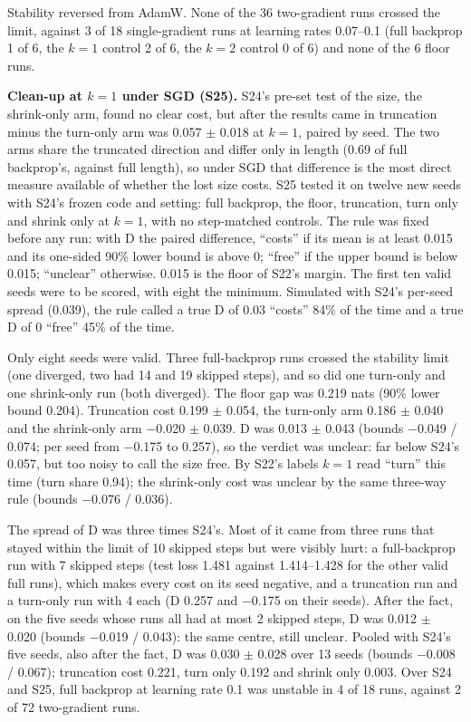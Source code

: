 \documentclass[10pt]{article}
\begin{document}
Stability reversed from AdamW. None of the 36 two-gradient runs crossed the limit, against 3 of 18 single-gradient runs at learning rates 0.07--0.1 (full backprop 1 of 6, the $k = 1$ control 2 of 6, the $k = 2$ control 0 of 6) and none of the 6 floor runs.

\textbf{Clean-up at $k = 1$ under SGD (S25).} S24's pre-set test of the size, the shrink-only arm, found no clear cost, but after the results came in truncation minus the turn-only arm was 0.057 $\pm$ 0.018 at $k = 1$, paired by seed. The two arms share the truncated direction and differ only in length (0.69 of full backprop's, against full length), so under SGD that difference is the most direct measure available of whether the lost size costs. S25 tested it on twelve new seeds with S24's frozen code and setting: full backprop, the floor, truncation, turn only and shrink only at $k = 1$, with no step-matched controls. The rule was fixed before any run: with D the paired difference, ``costs'' if its mean is at least 0.015 and its one-sided 90\% lower bound is above 0; ``free'' if the upper bound is below 0.015; ``unclear'' otherwise. 0.015 is the floor of S22's margin. The first ten valid seeds were to be scored, with eight the minimum. Simulated with S24's per-seed spread (0.039), the rule called a true D of 0.03 ``costs'' 84\% of the time and a true D of 0 ``free'' 45\% of the time.

Only eight seeds were valid. Three full-backprop runs crossed the stability limit (one diverged, two had 14 and 19 skipped steps), and so did one turn-only and one shrink-only run (both diverged). The floor gap was 0.219 nats (90\% lower bound 0.204). Truncation cost 0.199 $\pm$ 0.054, the turn-only arm 0.186 $\pm$ 0.040 and the shrink-only arm $-$0.020 $\pm$ 0.039. D was 0.013 $\pm$ 0.043 (bounds $-$0.049 / 0.074; per seed from $-$0.175 to 0.257), so the verdict was unclear: far below S24's 0.057, but too noisy to call the size free. By S22's labels $k = 1$ read ``turn'' this time (turn share 0.94); the shrink-only cost was unclear by the same three-way rule (bounds $-$0.076 / 0.036).

The spread of D was three times S24's. Most of it came from three runs that stayed within the limit of 10 skipped steps but were visibly hurt: a full-backprop run with 7 skipped steps (test loss 1.481 against 1.414--1.428 for the other valid full runs), which makes every cost on its seed negative, and a truncation run and a turn-only run with 4 each (D 0.257 and $-$0.175 on their seeds). After the fact, on the five seeds whose runs all had at most 2 skipped steps, D was 0.012 $\pm$ 0.020 (bounds $-$0.019 / 0.043): the same centre, still unclear. Pooled with S24's five seeds, also after the fact, D was 0.030 $\pm$ 0.028 over 13 seeds (bounds $-$0.008 / 0.067); truncation cost 0.221, turn only 0.192 and shrink only 0.003. Over S24 and S25, full backprop at learning rate 0.1 was unstable in 4 of 18 runs, against 2 of 72 two-gradient runs.
\end{document}
